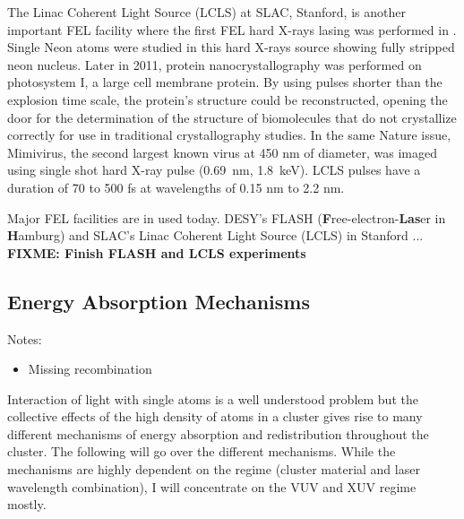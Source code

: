 The Linac Coherent Light Source (LCLS) at SLAC, Stanford, is another important
FEL facility where the first FEL hard X-rays lasing was performed in
\cite{Emma2010,Schneider2010}. Single Neon atoms were studied in
this hard X-rays source\cite{Young2010} showing fully stripped neon nucleus.
Later in 2011, protein nanocrystallography was performed \cite{Chapman2011}
on photosystem I, a large cell membrane protein. By using pulses shorter
than the explosion time scale, the protein's structure could be reconstructed,
opening the door for the determination of the structure of biomolecules that
do not crystallize correctly for use in traditional crystallography studies.
In the same Nature issue, Mimivirus, the second largest known virus at 450 nm
of diameter, was imaged using single shot hard X-ray pulse (0.69~nm,
1.8~keV)\cite{Seibert2011}. LCLS pulses have a duration of 70 to 500 fs at
wavelengths of 0.15 nm to 2.2 nm\cite{Pellegrini2011}.



Major FEL facilities are in used today. DESY's FLASH
(\textbf{F}ree-electron-\textbf{Las}er in \textbf{H}amburg) and
SLAC's Linac Coherent Light Source (LCLS) in Stanford ...
\textbf{FIXME: Finish FLASH and LCLS experiments}













\subsection{Energy Absorption Mechanisms}
\label{section:intro:clusters:heating}

Notes:
\begin{itemize}
\item Missing recombination
\end{itemize}

Interaction of light with single atoms is a well understood problem but the
collective effects of the high density of atoms in a cluster gives rise to many
different mechanisms of energy absorption and redistribution throughout the
cluster. The following will go over the different mechanisms. While the
mechanisms are highly dependent on the regime (cluster material and
laser wavelength combination), I will concentrate on the VUV and XUV
regime mostly.


